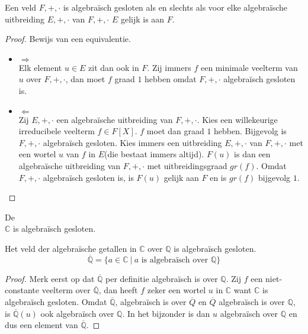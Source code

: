\documentclass[main.tex]{subfiles}
\begin{document}
\begin{ei}
  Een veld $F,+,\cdot$ is algebra\"isch gesloten als en slechts als voor elke algebra\"ische uitbreiding $E,+,\cdot$ van $F,+,\cdot$ $E$ gelijk is aan $F$.

  \begin{proof}
    Bewijs van een equivalentie.
    \begin{itemize}
    \item $\Rightarrow$\\
      Elk element $u\in E$ zit dan ook in $F$.
      Zij immers $f$ een minimale veelterm van $u$ over $F,+,\cdot$, dan moet $f$ graad $1$ hebben omdat $F,+,\cdot$ algebra\"isch gesloten is.
    \item $\Leftarrow$\\
    Zij $E,+,\cdot$ een algebra\"ische uitbreiding van $F,+,\cdot$.
      Kies een willekeurige irreducibele veelterm $f\in F[X]$.
      $f$ moet dan graad $1$ hebben. Bijgevolg is $F,+,\cdot$ algebra\"isch gesloten.
      Kies immers een uitbreiding $E,+,\cdot$ van $F,+,\cdot$ met een wortel $u$ van $f$ in $E$(die bestaat immers altijd).
      $F(u)$ is dan een algebra\"ische uitbreiding van $F,+,\cdot$ met uitbreidingsgraad $gr(f)$.
      Omdat $F,+,\cdot$ algebra\"isch gesloten is, is $F(u)$ gelijk aan $F$ en is $gr(f)$ bijgevolg $1$. 
    \end{itemize}
  \end{proof}
\end{ei}

\begin{st}
  De \\
  $\mathbb{C}$ is algebra\"isch gesloten.
\zb
\end{st}


\begin{pr}
  Het veld der algebra\"ische getallen in $\mathbb{C}$ over $\mathbb{Q}$ is algebra\"isch gesloten.
  \[ \overline{\mathbb{Q}} = \{ a \in \mathbb{C} \ |\ a \text{ is algebra\"isch over } \mathbb{Q} \} \]

  \begin{proof}
    Merk eerst op dat $\overline{\mathbb{Q}}$ per definitie algebra\"isch is over $\mathbb{Q}$.
    Zij $f$ een niet-constante veelterm over $\overline{\mathbb{Q}}$, dan heeft $f$ zeker een wortel $u$ in $\mathbb{C}$ want $\mathbb{C}$ is algebra\"isch gesloten.
    Omdat $\overline{\mathbb{Q}}$, algebra\"isch is over $\overline{Q}$ en $\overline{Q}$ algebra\"isch is over $\mathbb{Q}$, is $\overline{\mathbb{Q}}(u)$ ook algebra\"isch over $\mathbb{Q}$.
    In het bijzonder is dan $u$ algebra\"isch over $\mathbb{Q}$ en dus een element van $\overline{\mathbb{Q}}$.
  \end{proof}
\end{pr}
\end{document}
